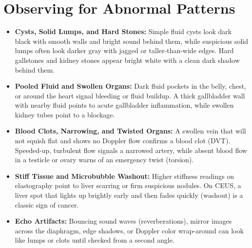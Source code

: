 \section{Observing for Abnormal Patterns}
\begin{itemize}
  \item \textbf{Cysts, Solid Lumps, and Hard Stones:} Simple fluid cysts look dark black with smooth walls and bright sound behind them, while suspicious solid lumps often look darker gray with jagged or taller-than-wide edges. Hard gallstones and kidney stones appear bright white with a clean dark shadow behind them.
  \item \textbf{Pooled Fluid and Swollen Organs:} Dark fluid pockets in the belly, chest, or around the heart signal bleeding or fluid buildup. A thick gallbladder wall with nearby fluid points to acute gallbladder inflammation, while swollen kidney tubes point to a blockage.
  \item \textbf{Blood Clots, Narrowing, and Twisted Organs:} A swollen vein that will not squish flat and shows no Doppler flow confirms a blood clot (DVT). Speeded-up, turbulent flow signals a narrowed artery, while absent blood flow in a testicle or ovary warns of an emergency twist (torsion).
  \item \textbf{Stiff Tissue and Microbubble Washout:} Higher stiffness readings on elastography point to liver scarring or firm suspicious nodules. On CEUS, a liver spot that lights up brightly early and then fades quickly (washout) is a classic sign of cancer.
  \item \textbf{Echo Artifacts:} Bouncing sound waves (reverberations), mirror images across the diaphragm, edge shadows, or Doppler color wrap-around can look like lumps or clots until checked from a second angle.
\end{itemize}

